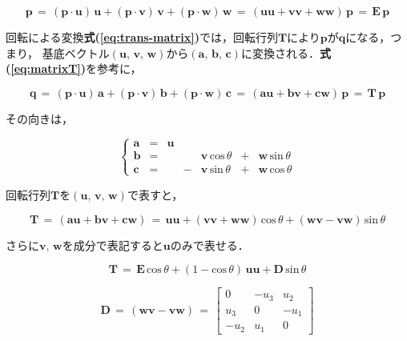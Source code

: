\begin{equation}
\bm p \,=\, (\bm p \cdot \bm u)\,\bm u + (\bm p \cdot \bm v)\,\bm v + (\bm p \cdot \bm w)\,\bm w
\,=\, (\bm{uu} + \bm{vv} + \bm{ww})\, \bm p
\,=\, \bm E \, \bm p
\label{eq:rot 1}
\end{equation}

回転による変換\textbf{式(\ref{eq:trans-matrix})}では，回転行列$\bm T$により$\bm p$が$\bm q$になる，つまり，
基底ベクトル$(\bm u,\, \bm v,\, \bm w)$から$(\bm a,\, \bm b,\, \bm c)$に変換される．\textbf{式(\ref{eq:matrixT})}を参考に，

\begin{equation}
\bm q \,=\, (\bm p \cdot \bm u)\,\bm a + (\bm p \cdot \bm v)\,\bm b + (\bm p \cdot \bm w)\,\bm c
\,=\, (\bm{au} + \bm{bv} + \bm{cw})\, \bm p
\,=\, \bm T \, \bm p
\label{eq:rot 2}
\end{equation}

その向きは，

\[
\left\{
\begin{array}{lllllll}
\bm a & = & \bm u & & & &\\
\bm b & = & &   & \bm v\, \mathrm{cos}\, \theta & + & \bm w\, \mathrm{sin}\, \theta \\
\bm c & = & & - & \bm v\, \mathrm{sin}\, \theta & + & \bm w\, \mathrm{cos}\, \theta 
\end{array}
\right.
\]

回転行列$\bm T$を$(\bm u,\, \bm v,\, \bm w)$で表すと，

\begin{equation}
\bm T \,=\, (\bm{au} + \bm{bv} + \bm{cw})
\,=\, \bm{uu} + (\bm{vv}+\bm{ww})\,\mathrm{cos}\,\theta + (\bm{wv}-\bm{vw})\,\mathrm{sin}\,\theta
\label{eq:rot 3}
\end{equation}


\noindent さらに$\bm v,\,\bm w$を成分で表記すると$\bm u$のみで表せる．

\begin{equation}
\bm T
\,=\, \bm E \,\mathrm{cos}\,\theta + (1-\mathrm{cos}\,\theta)\,\bm{uu} + \bm D\, \mathrm{sin}\,\theta
\label{eq:rot 3}
\end{equation}

\begin{equation}
\bm D \,=\, (\bm{wv}-\bm{vw}) \,=\,
\left[
\begin{array}{ccc}
0  & -u_3  & u_2  \\
u_3  &  0 & -u_1  \\
-u_2  & u_1  &  0 
\end{array}
\right]
\label{eq:rot 4}
\end{equation}

